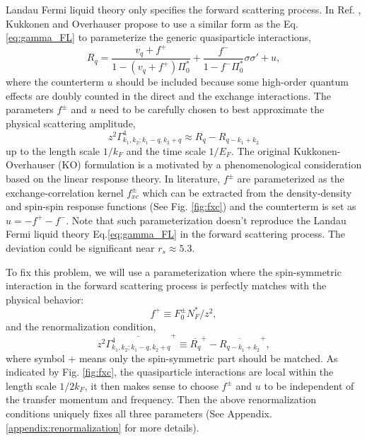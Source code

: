 \documentclass[reprint,amsmath,amssymb,aps,prb]{revtex4-1}
\begin{document}
Landau Fermi liquid theory only specifies the forward scattering process. In Ref. , Kukkonen and Overhauser propose to use a similar form as the Eq.\eqref{eq:gamma_FL} to parameterize the generic quasiparticle interactions,
\begin{equation}
    \label{eq:KO}
    R_q = \frac{v_q+f^+}{1-(v_q+f^+)\Pi^*_0}+\frac{f^-}{1-f^-\Pi_0^*}\sigma\sigma'+ u,
\end{equation}
where the counterterm $u$ should be included because some high-order quantum effects are doubly counted in the direct and the exchange interactions. The parameters $f^\pm$ and $u$ need to be carefully chosen to best approximate the physical scattering amplitude,
\begin{equation}
    z^2\Gamma^4_{k_1, k_2; k_1-q, k_2+q} \approx R_q - R_{q-k_1+k_2}
\end{equation}
up to the length scale $1/k_F$ and the time scale $1/E_F$.
The original Kukkonen-Overhauser (KO) formulation is a motivated by a phenomenological consideration based on the linear response theory. In literature, $f^\pm$ are parameterized as the exchange-correlation kernel $f_{xc}^\pm$ which can be extracted from the density-density and spin-spin response functions (See Fig. \ref{fig:fxc}) and the counterterm is set as $u=-f^+-f^-$. Note that such parameterization doesn't reproduce the Landau Fermi liquid theory Eq.\eqref{eq:gamma_FL} in the forward scattering process. The deviation could be significant near $r_s\approx 5.3$.

To fix this problem, we will use a parameterization where the spin-symmetric interaction in the forward scattering process is perfectly matches with the physical behavior:
\begin{equation}
    \label{eq:renorm_f1}
    f^+ \equiv F_0^\pm N_F^*/z^2,
\end{equation}
and the renormalization condition,
\begin{equation}
    \label{eq:renorm_f2}
    z^2\overline{\Gamma^{4}_{k_1, k_2; k_1-q, k_2+q}}^+ \equiv \overline{R_q}^+ - \overline{R_{q-k_1+k_2}}^+,
\end{equation}
where symbol $+$ means only the spin-symmetric part should be matched. As indicated by Fig. \ref{fig:fxc}, the quasiparticle interactions are local within the length scale $1/2k_F$, it then makes sense to choose $f^\pm$ and $u$ to be independent of the transfer momentum and frequency. Then the above renormalization conditions uniquely fixes all three parameters (See Appendix. \ref{appendix:renormalization} for more details).
\end{document}
